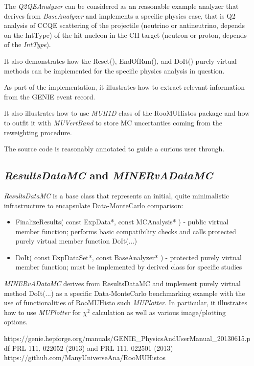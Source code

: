 The {\it Q2QEAnalyzer} can be considered as an reasonable example analyzer that derives from {\it BaseAnalyzer} 
and implements a specific physics case, that is Q2 analysis of CCQE scattering of the projectile (neutrino 
or antineutrino, depends on the IntType) of the hit nucleon in the CH target (neutron or proton, depends of 
the {\it IntType}).

It also demonstrates how the Reset(), EndOfRun(), and DoIt() purely virtual methods can be implemented for 
the specific physics analysis in question.

As part of the implementation, it illustrates how to extract relevant information from the GENIE event record.

It also illustrates how to use {\it MUH1D} class of the RooMUHistos package\cite{roomuhistos} and how to outfit it
with {\it MUVertBand} to store MC uncertanties coming from the reweighting procedure.

The source code is reasonably annotated to guide a curious user through.

\subsection{ {\it ResultsDataMC} and {\it MINERvADataMC} }

{\it ResultsDataMC} is a base class that represents an initial, quite minimalistic infrastructure to encapsulate 
Data-MonteCarlo comparison:
\begin{itemize}
\item{  FinalizeResults( const ExpData*, const MCAnalysis* ) - public virtual member function; performs basic 
compatibility checks and calls protected purely virtual member function DoIt(...)}
\item{ DoIt( const ExpDataSet*, const BaseAnalyzer* ) - protected purely virtual member function; must be implemented 
by derived class for specific studies}
\end{itemize}

{\it MINERvADataMC} derives from ResultsDataMC and implement purely virtual method DoIt(...) as a specific Data-MonteCarlo
benchmarking example with the use of functionalities of RooMUHisto such {\it MUPlotter}. In particular, it illustrates how
to use {\it MUPlotter} for $\chi^{2}$ calculation as well as various image/plotting options. 


\begin{thebibliography}{99}
 https://genie.hepforge.org/manuals/GENIE\_PhysicsAndUserManual\_20130615.pdf
 PRL 111, 022052 (2013) and PRL 111, 022501 (2013)
 https://github.com/ManyUniverseAna/RooMUHistos
\end{thebibliography}


